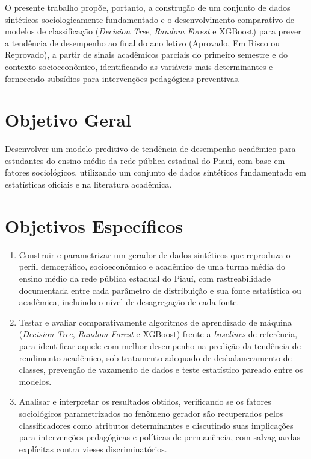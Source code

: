O presente trabalho propõe, portanto, a construção de um conjunto de dados sintéticos sociologicamente fundamentado e o desenvolvimento comparativo de modelos de classificação (\textit{Decision Tree}, \textit{Random Forest} e XGBoost) para prever a tendência de desempenho ao final do ano letivo (Aprovado, Em Risco ou Reprovado), a partir de sinais acadêmicos parciais do primeiro semestre e do contexto socioeconômico, identificando as variáveis mais determinantes e fornecendo subsídios para intervenções pedagógicas preventivas.

\section{Objetivo Geral}

Desenvolver um modelo preditivo de tendência de desempenho acadêmico para estudantes do ensino médio da rede pública estadual do Piauí, com base em fatores sociológicos, utilizando um conjunto de dados sintéticos fundamentado em estatísticas oficiais e na literatura acadêmica.

\section{Objetivos Específicos}

\begin{enumerate}
    \item Construir e parametrizar um gerador de dados sintéticos que reproduza o perfil demográfico, socioeconômico e acadêmico de uma turma média do ensino médio da rede pública estadual do Piauí, com rastreabilidade documentada entre cada parâmetro de distribuição e sua fonte estatística ou acadêmica, incluindo o nível de desagregação de cada fonte.
    \item Testar e avaliar comparativamente algoritmos de aprendizado de máquina (\textit{Decision Tree}, \textit{Random Forest} e XGBoost) frente a \textit{baselines} de referência, para identificar aquele com melhor desempenho na predição da tendência de rendimento acadêmico, sob tratamento adequado de desbalanceamento de classes, prevenção de vazamento de dados e teste estatístico pareado entre os modelos.
    \item Analisar e interpretar os resultados obtidos, verificando se os fatores sociológicos parametrizados no fenômeno gerador são recuperados pelos classificadores como atributos determinantes e discutindo suas implicações para intervenções pedagógicas e políticas de permanência, com salvaguardas explícitas contra vieses discriminatórios.
\end{enumerate}
